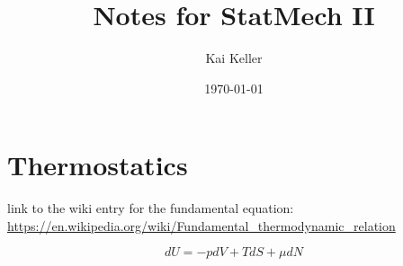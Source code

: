 \documentclass[a4paper]{article}
\title{Notes for StatMech II}
\author{Kai Keller}
\date{\today}
\begin{document}
\maketitle
\tableofcontents

\newpage

\section{Thermostatics}

link to the wiki entry for the fundamental equation: 
\url{https://en.wikipedia.org/wiki/Fundamental_thermodynamic_relation}

\begin{equation}
    dU=-pdV+TdS+\mu dN
\end{equation}
\end{document}
